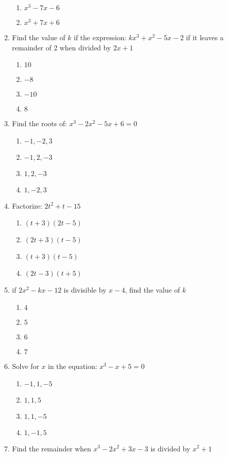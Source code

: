 \begin{multicols}{2}
\begin{enumerate}[label={\arabic*.}]
\begin{enumerate}[label={\Alph*.}]
	\item \(x^3 -7x -6\)
	\item \(x^3 +7x +6\)
	\end{enumerate}
\item Find the value of $k$ if the expression: $kx^3 + x^2 -5x -2$ if it  leaves a remainder of 2 when divided by $2x+1$
	\begin{enumerate}[label={\Alph*.}]
	\item \(10\)
	\item \(-8\)
	\item \(-10\)
	\item \(8\)
	\end{enumerate}
\item Find the roots of: $x^3 - 2x^2 - 5x + 6 = 0$
	\begin{enumerate}[label={\Alph*.}]
	\item \(-1, -2, 3\)
	\item \(-1, 2, -3\)
	\item \(1,2,-3\)
	\item \(1,-2,3\)
	\end{enumerate}
\item Factorize: $2t^2 + t -15$
	\begin{enumerate}[label={\Alph*.}]
	\item \((t+3)(2t-5)\)
	\item \((2t+3)(t-5)\)
	\item \((t+3)(t-5)\)
	\item \((2t-3)(t+5)\)
	\end{enumerate}
\item if $2x^2 - kx -12$ is divisible by $x-4$, find the value of $k$ 
	\begin{enumerate}[label={\Alph*.}]
	\item \(4\)
	\item \(5\)
	\item \(6\)
	\item \(7\)
	\end{enumerate}
\item Solve for $x$ in the equation: $x^3 - x + 5 = 0$
	\begin{enumerate}[label={\Alph*.}]
	\item \(-1, 1, -5\)
	\item \(1,1,5\)
	\item \(1,1,-5\)
	\item \(1,-1,5\)
	\end{enumerate}
\item Find the remainder when $x^3 - 2x^2 + 3x -3$ is divided by $x^2 + 1$ 

\end{enumerate}
\end{multicols}
